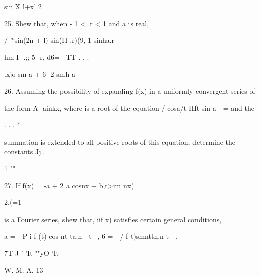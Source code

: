 sin X l+x' 2

25. Shew that, when - 1 < .r < 1 and a is real,

/ '°sin(2n + l) sin(H-.r)(9, 1 sinha.r

hm I -.;; 5 -r, d6= --TT .-, .

  .xjo sm a + 6- 2 smh a


26. Assuming the possibility of expanding f(x) in a uniformly
convergent series of

the form A -ainkx, where is a root of the equation /-cosa/t-Hft sin a
- = and the

  . . . *

summation is extended to all positive roots of this equation,
determine the constants Jj..


1 ""

27. If f(x) = -a + 2 a cosnx + b,t>im nx)

2,(=1

is a Fourier series, shew that, iif x) satisfies certain general
conditions,

a = - P i f (t) cos nt ta.n - t --, 6 = - / f t)smnttn,n-t - .

7T J ' 'It ""yO 'It


W. M. A. 13

